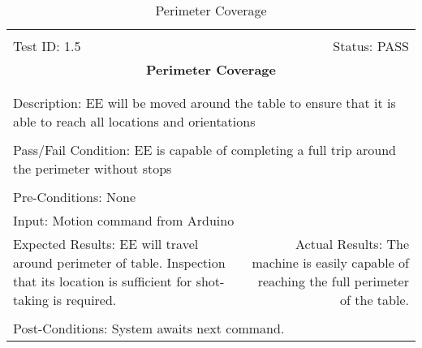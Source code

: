 \documentclass[titlepage]{article}
\begin{document}
\begin{center}
\begin{table}[h!]
\begin{tabular}{|l r|}\hline&\\[-2mm]
	Test ID: 1.5	&Status: PASS\\[-3mm]
	\multicolumn{2}{|c|}{\textbf{\large{Perimeter Coverage}}}\\&\\\hline&\\[-3mm]
	\multicolumn{2}{|p{\textwidth}|}{Description: EE will be moved around the table to ensure that it is able to reach all locations and orientations}\\[1mm]\hline&\\[-3mm]
	\multicolumn{2}{|p{\textwidth}|}{Pass/Fail Condition: EE is capable of completing a full trip around the perimeter without stops}\\[1mm]\hline&\\[-3mm]
	\multicolumn{2}{|p{\textwidth}|}{Pre-Conditions: None}\\[4mm]
	\multicolumn{2}{|p{\textwidth}|}{Input: Motion command from Arduino}\\[2mm]\hline
	\multicolumn{1}{|p{0.49\textwidth}}{Expected Results: EE will travel around perimeter of table. Inspection that its location is sufficient for shot-taking is required.}	&\multicolumn{1}{|p{0.45\textwidth}|}{Actual Results: The machine is easily capable of reaching the full perimeter of the table.}\\\hline&\\[-3mm]
	\multicolumn{2}{|p{\textwidth}|}{Post-Conditions: System awaits next command.}\\\hline
\end{tabular}
\caption{Perimeter Coverage}
\end{table}
\end{center}
\end{document}
